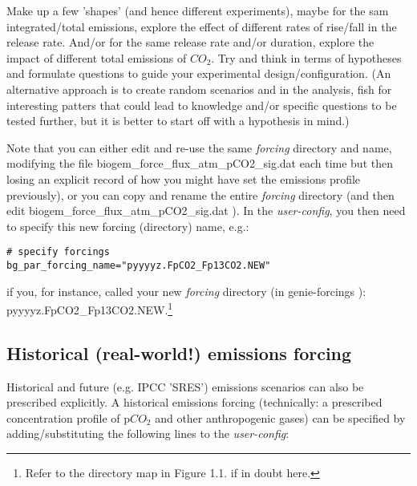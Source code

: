 \documentclass[11pt,fleqn]{book} %
\begin{document}
Make up a few 'shapes' (and hence different experiments), maybe for the sam integrated/total emissions, explore the effect of different rates of rise/fall in the release rate. And/or for the same release rate and/or duration, explore the impact of different total emissions of \(CO_{2}\). Try and think in terms of hypotheses and formulate questions to guide your experimental design/configuration. (An alternative approach is to create random scenarios and in the analysis, fish for interesting patters that could lead to knowledge and/or specific questions to be tested further, but it is better to start off with a hypothesis in mind.)

Note that you can either edit and re-use the same \textit{forcing} directory and name, modifying the file \footnotesize\textsf{biogem\_force\_flux\_atm\_pCO2\_sig.dat }\normalsize each time but then losing an explicit record of how you might have set the emissions profile previously), or you can copy and rename the entire \textit{forcing} directory (and then edit \footnotesize\textsf{biogem\_force\_flux\_atm\_pCO2\_sig.dat }\normalsize). In the \textit{user-config}, you then need to specify this new forcing (directory) name, e.g.:
\vspace{-2pt}\begin{verbatim}
# specify forcings
bg_par_forcing_name="pyyyyz.FpCO2_Fp13CO2.NEW"
\end{verbatim}\vspace{-2pt}
if you, for instance, called your new \textit{forcing} directory (in \footnotesize\textsf{genie-forcings }\normalsize): \footnotesize\textsf{pyyyyz.FpCO2\_Fp13CO2.NEW}\normalsize.\footnote{Refer to the directory map in Figure 1.1. if in doubt here.}

\vspace{20pt}


\subsection{Historical (real-world!) emissions forcing}

Historical and future (e.g. IPCC 'SRES') emissions scenarios can also be prescribed explicitly. A historical emissions forcing (technically: a prescribed concentration profile of p\(CO_{2}\) and other anthropogenic gases) can be specified by adding/substituting the following lines to the \textit{\textit{user-config}}:
\end{document}
